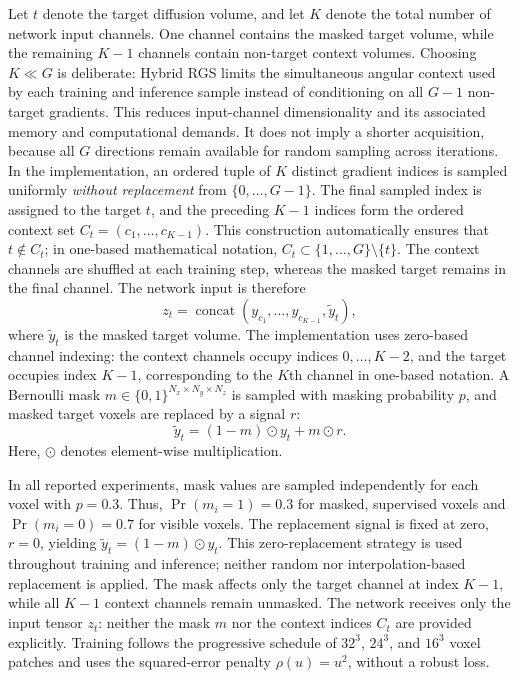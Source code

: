 \documentclass[preprint,12pt]{elsarticle}
\begin{document}
Let $t$ denote the target diffusion volume, and let $K$ denote the total number of network input channels. One channel contains the masked target volume, while the remaining $K-1$ channels contain non-target context volumes. Choosing $K\ll G$ is deliberate: Hybrid RGS limits the simultaneous angular context used by each training and inference sample instead of conditioning on all $G-1$ non-target gradients. This reduces input-channel dimensionality and its associated memory and computational demands. It does not imply a shorter acquisition, because all $G$ directions remain available for random sampling across iterations. In the implementation, an ordered tuple of $K$ distinct gradient indices is sampled uniformly \emph{without replacement} from $\{0,\ldots,G-1\}$. The final sampled index is assigned to the target $t$, and the preceding $K-1$ indices form the ordered context set $C_t=(c_1,\ldots,c_{K-1})$. This construction automatically ensures that $t \notin C_t$; in one-based mathematical notation, $C_t \subset \{1,\ldots,G\}\setminus\{t\}$. The context channels are shuffled at each training step, whereas the masked target remains in the final channel. The network input is therefore
\begin{equation}
  z_t = \operatorname{concat}(y_{c_1},\ldots,y_{c_{K-1}},\tilde{y}_t),
  \label{eq:rgs-input}
\end{equation}
where $\tilde{y}_t$ is the masked target volume. The implementation uses zero-based channel indexing: the context channels occupy indices $0,\ldots,K-2$, and the target occupies index $K-1$, corresponding to the $K$th channel in one-based notation. A Bernoulli mask $m \in \{0,1\}^{N_x \times N_y \times N_z}$ is sampled with masking probability $p$, and masked target voxels are replaced by a signal $r$:
\begin{equation}
  \tilde{y}_t = (1-m) \odot y_t + m \odot r.
  \label{eq:masked-target}
\end{equation}
Here, $\odot$ denotes element-wise multiplication.

In all reported experiments, mask values are sampled independently for each voxel with $p=0.3$. Thus, $\Pr(m_i=1)=0.3$ for masked, supervised voxels and $\Pr(m_i=0)=0.7$ for visible voxels. The replacement signal is fixed at zero, $r=0$, yielding $\tilde{y}_t=(1-m)\odot y_t$. This zero-replacement strategy is used throughout training and inference; neither random nor interpolation-based replacement is applied. The mask affects only the target channel at index $K-1$, while all $K-1$ context channels remain unmasked. The network receives only the input tensor $z_t$: neither the mask $m$ nor the context indices $C_t$ are provided explicitly. Training follows the progressive schedule of $32^3$, $24^3$, and $16^3$ voxel patches and uses the squared-error penalty $\rho(u)=u^2$, without a robust loss.
\end{document}
